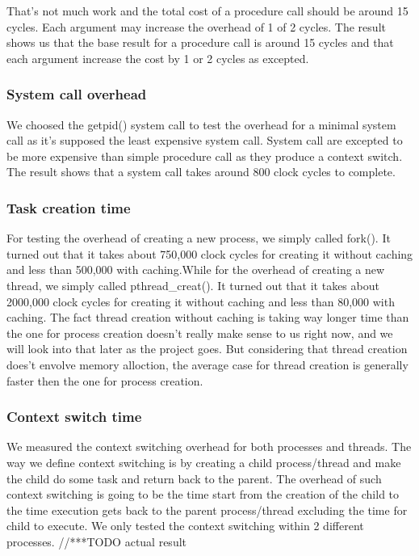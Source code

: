 That's not much work and the total cost of a procedure call should be around 15
cycles. Each argument may increase the overhead of 1 of 2 cycles.
The result shows us that the base result for a procedure call is around 15
cycles and that each argument increase the cost by 1 or 2 cycles as excepted.

\subsubsection{System call overhead}
We choosed the getpid() system call to test the overhead for a minimal system
call as it's supposed the least expensive system call.
System call are excepted to be more expensive than simple procedure call as they
produce a context switch.
The result shows that a system call takes around 800 clock cycles to complete.

\subsubsection{Task creation time}
For testing the overhead of creating a new process, we simply called fork(). It turned out that it takes about 750,000 clock cycles for creating it without caching and less than 500,000 with caching.While for the overhead of creating a new thread, we simply called pthread\_creat(). It turned out that it takes about 2000,000 clock cycles for creating it without caching and less than 80,000 with caching.
The fact thread creation without caching is taking way longer time than the one for process creation doesn't really make sense to us right now, and we will look into that later as the project goes. But considering that thread creation does't envolve memory alloction, the average case for thread creation is generally faster then the one for process creation.


\subsubsection{Context switch time}
We measured the context switching overhead for both processes and threads. The way we define context switching is by creating a child process/thread and make the child do some task and return back to the parent. The overhead of such context switching is going to be the time start from the creation of the child to the time execution gets back to the parent process/thread excluding the time for child to execute. We only tested the context switching within 2 different processes.
//***TODO actual result



